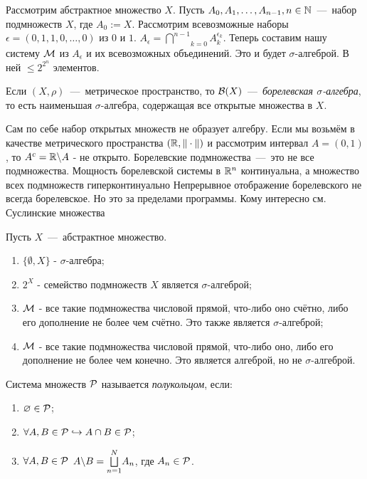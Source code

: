 \begin{example}
Рассмотрим абстрактное множество $X$. Пусть $A_0, A_1, \dots, A_{n-1}, n \in \mathbb{N}$~---~набор подмножеств $X$, где $A_0 := X$.
Рассмотрим всевозможные наборы $\epsilon = (0, 1, 1, 0, \dots, 0)$ из $0$ и $1$. $A_\epsilon = \underset{k = 0}{\overset{n - 1}{\bigcap}} A_k^{\epsilon_k}$. Теперь составим нашу систему $\mathcal{M}$ из $A_\epsilon$ и их всевозможных объединений. Это и будет $\sigma$-алгеброй. В ней $\leq 2^{2^n}$ элементов.
\end{example}

 Если $(X, \rho)$~---~метрическое пространство, то $\mathcal{B}(X)$~---~\textit{борелевская $\sigma$-алгебра}, то есть наименьшая $\sigma$-алгебра, содержащая все открытые множества в $X$.

\remark Сам по себе набор открытых множеств не образует алгебру. Если мы возьмём в качестве метрического пространства $(\mathbb{R}, \|\cdot\|)$ и рассмотрим интервал $A = (0, 1)$, то $A^c = \mathbb{R} \backslash A$ - не открыто.
\remark Борелевские подмножества~---~это не все подмножества. Мощность борелевской системы в $\mathbb{R}^n$ континуальна, а множество всех подмножеств гиперконтинуально
\remark Непрерывное отображение борелевского не всегда борелевское. Но это за пределами программы. Кому интересно см. Суслинские множества

\examples Пусть $X$~---~абстрактное множество.
\begin{enumerate}
    \item $\{\emptyset, X\}$ - $\sigma$-алгебра;
    \item $2^X$ - семейство подмножеств $X$ является $\sigma$-алгеброй;
    \item $\mathcal{M}$ - все такие подмножества числовой прямой, что-либо оно счётно, либо его дополнение не более чем счётно. Это также является $\sigma$-алгеброй;
    \item $\mathcal{M}$ - все такие подмножества числовой прямой, что-либо оно, либо его дополнение не более чем конечно. Это является алгеброй, но не $\sigma$-алгеброй.
\end{enumerate}

 Система множеств $\mathcal{P}$ называется \textit{полукольцом}, если:

\begin{enumerate}
    \item $\varnothing \in \mathcal{P}$;
    \item $\forall A, B \in \mathcal{P} \hookrightarrow A \cap B \in \mathcal{P}$;
    \item $\forall A, B \in \mathcal{P}$ $A \backslash B = \overset{N}{\underset{n = 1}{\bigsqcup}} A_n$, где $A_n \in \mathcal{P}$.
\end{enumerate}

